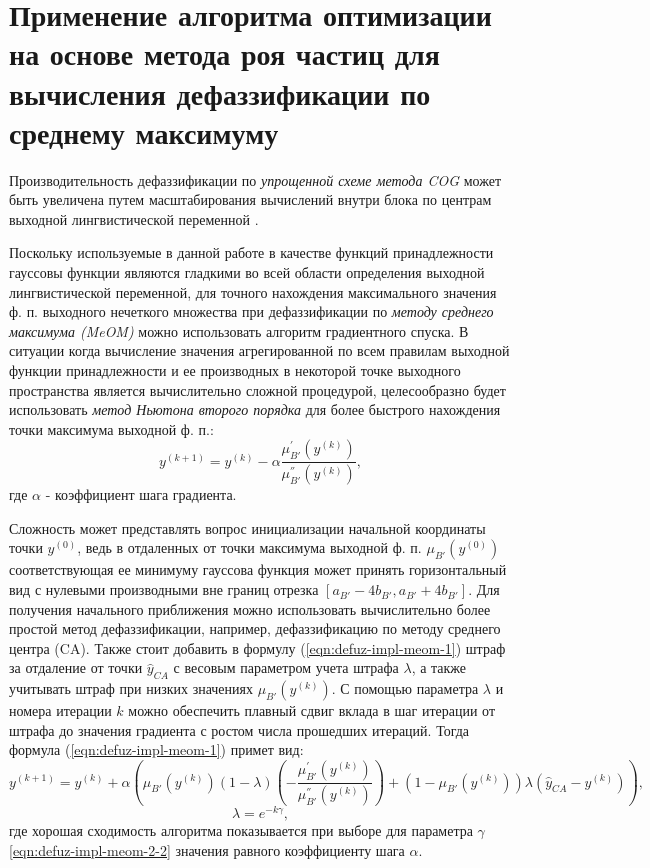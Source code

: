 \section{Применение алгоритма оптимизации на основе метода роя частиц для вычисления дефаззификации по среднему максимуму}

Производительность дефаззификации по \textit{упрощенной схеме метода COG} может быть увеличена путем масштабирования вычислений внутри блока по центрам выходной лингвистической переменной \cite{VanLeekwijck1999}.

Поскольку используемые в данной работе в качестве функций принадлежности гауссовы функции являются гладкими во всей области определения выходной лингвистической переменной, для точного нахождения максимального значения ф. п. выходного нечеткого множества при дефаззификации по \textit{методу среднего максимума (MeOM)} \cite{VanLeekwijck1999} можно использовать алгоритм градиентного спуска. В ситуации когда вычисление значения агрегированной по всем правилам выходной функции принадлежности и ее производных в некоторой точке выходного пространства является вычислительно сложной процедурой, целесообразно будет использовать \textit{метод Ньютона второго порядка} \cite{NocedalWright2006} для более быстрого нахождения точки максимума выходной ф. п.:
\begin{equation}
	\label{eqn:defuz-impl-meom-1}
	y^{(k+1)} = y^{(k)} - \alpha \frac{\mu_{B'}^{'}(y^{(k)})}{\mu_{B'}^{''}(y^{(k)})},
\end{equation}
где $\alpha $ - коэффициент шага градиента.

Сложность может представлять вопрос инициализации начальной координаты точки $y^{(0)}$, ведь в отдаленных от точки максимума выходной ф. п. $\mu_{B'}(y^{(0)})$  соответствующая ее минимуму гауссова функция может принять горизонтальный вид с нулевыми производными вне границ отрезка $[a_{B'} - 4 b_{B'}, a_{B'} + 4 b_{B'}]$. Для получения начального приближения можно использовать вычислительно более простой метод дефаззификации, например, дефаззификацию по методу среднего центра (CA). Также стоит добавить в формулу (\ref{eqn:defuz-impl-meom-1}) штраф за отдаление от точки $\hat{y}_{CA}$ с весовым параметром учета штрафа $\lambda$, а также учитывать штраф при низких значениях $\mu_{B'}(y^{(k)})$. С помощью параметра $\lambda$ и номера итерации $k$ можно обеспечить плавный сдвиг вклада в шаг итерации от штрафа до значения градиента с ростом числа прошедших итераций. Тогда формула (\ref{eqn:defuz-impl-meom-1}) примет вид:
\begin{equation}
	\label{eqn:defuz-impl-meom-2}
	y^{(k+1)} = y^{(k)} + \alpha \left(\mu_{B'}(y^{(k)})(1-\lambda)\left(-\frac{\mu_{B'}^{'}(y^{(k)})}{\mu_{B'}^{''}(y^{(k)})}\right) + (1-\mu_{B'}(y^{(k)}))\lambda (\hat{y}_{CA} - y^{(k)})\right),
\end{equation}
\begin{equation}
	\label{eqn:defuz-impl-meom-2-2}
	\lambda = e^{-k \gamma},
\end{equation}
где хорошая сходимость алгоритма показывается при выборе для параметра $\gamma$ \eqref{eqn:defuz-impl-meom-2-2} значения равного коэффициенту шага $\alpha$.

